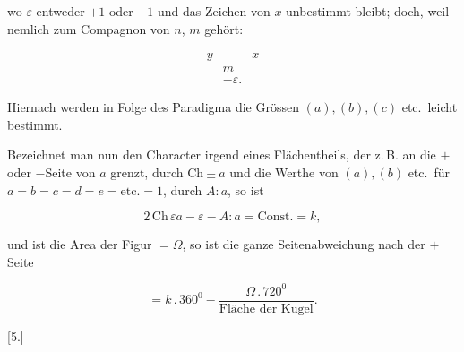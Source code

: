 %
\noindent wo $\varepsilon$ entweder $+1$ oder $-1$ und das Zeichen von $x$
unbestimmt bleibt; doch, weil nemlich zum Compagnon von $n$, $m$ gehört:

\[
\begin{array}{ccc}
y&&x \\
&m& \\
&-\varepsilon.&
\end{array}
\]

\noindent Hiernach werden in Folge des Paradigma die Grössen $(a), (b),
(c)$ etc.\ leicht bestimmt.

Bezeichnet man nun den Character irgend eines Flächentheils, der
z.\,B. an die $+$ oder $-$Seite von $a$ grenzt, durch $\mathrm{Ch}\pm a$
und die Werthe von $(a), (b)$ etc.\ für $a=b=c=d=e=\text{etc.}=1$, durch
$A:a$, so ist

\[
2\,\mathrm{Ch}\,\varepsilon a - \varepsilon - A:a = \text{Const.} = k,
\]

\noindent und ist die Area der Figur $= \Omega$, so ist die ganze Seitenabweichung
nach der $+$Seite

\[
= k\,.\,360^0 - \frac{\Omega\,.\,720^0}{\text{Fläche der Kugel}}.
\]

\begin{center}[5.]\end{center}

\begin{center}\end{center}
